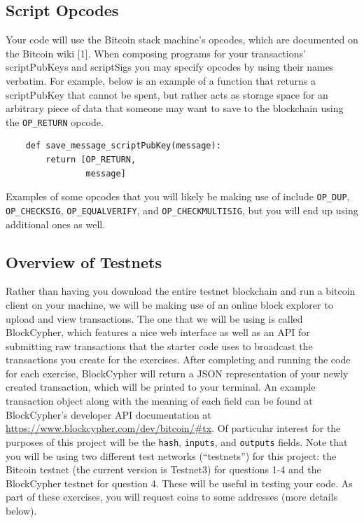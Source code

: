 \documentclass[11pt]{article}
\begin{document}
\subsection{Script Opcodes}
Your code will use the Bitcoin stack machine's opcodes, which are documented on the Bitcoin wiki [1]. When composing programs for your transactions' scriptPubKeys and scriptSigs you may specify opcodes by using their names verbatim. For example, below is an example of a function that returns a scriptPubKey that cannot be spent, but rather acts as storage space for an arbitrary piece of data that someone may want to save to the blockchain using the \texttt{OP\_RETURN} opcode.
\begin{verbatim}
    def save_message_scriptPubKey(message):
        return [OP_RETURN,
                message]
\end{verbatim}

\hspace{20pt}Examples of some opcodes that you will likely be making use of include \texttt{OP\_DUP}, \texttt{OP\_CHECKSIG}, \texttt{OP\_EQUALVERIFY}, and \texttt{OP\_CHECKMULTISIG}, but you will end up using additional ones as well.

\subsection{Overview of Testnets} {\label{testnets}}
Rather than having you download the entire testnet blockchain and run a bitcoin client on your machine, we will be making use of an online block explorer to upload and view transactions. The one that we will be using is called BlockCypher, which features a nice web interface as well as an API for submitting raw transactions that the starter code uses to broadcast the transactions you create for the exercises. After completing and running the code for each exercise, BlockCypher will return a JSON representation of your newly created transaction, which will be printed to your terminal. An example transaction object along with the meaning of each field can be found at BlockCypher's developer API documentation at 
\href{https://www.blockcypher.com/dev/bitcoin/\#tx}{https://www.blockcypher.com/dev/bitcoin/\#tx}.
Of particular interest for the purposes of this project will be the \texttt{hash}, \texttt{inputs}, and \texttt{outputs} fields. Note that you will be using two different test networks (``testnets'') for this project: the Bitcoin testnet (the current version is Testnet3) for questions 1-4 and the BlockCypher testnet for question 4. These will be useful in testing your code. As part of these exercises, you will request coins to some addresses (more details below).
\end{document}
